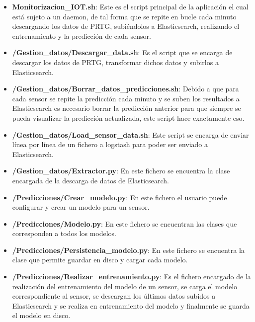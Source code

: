 \begin{itemize}
    \item \textbf{Monitorizacion\_IOT.sh}: Este es el script principal de la aplicación el cual está sujeto a un daemon, de tal forma que se repite en bucle cada minuto descargando los datos de PRTG, subiéndolos a Elasticsearch, realizando el entrenamiento y la predicción de cada sensor.
    
    \item \textbf{/Gestion\_datos/Descargar\_data.sh}: Es el script que se encarga de descargar los datos de PRTG, transformar dichos datos y subirlos a Elasticsearch.
    
    \item \textbf{/Gestion\_datos/Borrar\_datos\_predicciones.sh}: Debido a que para cada sensor se repite la predicción cada minuto y se suben los resultados a Elasticsearch es necesario borrar la predicción anterior para que siempre se pueda visualizar la predicción actualizada, este script hace exactamente eso.
    
    \item \textbf{/Gestion\_datos/Load\_sensor\_data.sh}: Este script se encarga de enviar línea por línea de un fichero a logstash para poder ser enviado a Elasticsearch.
    
    \item \textbf{/Gestion\_datos/Extractor.py}: En este fichero se encuentra la clase encargada de la descarga de datos de Elasticsearch.
    
    \item \textbf{/Predicciones/Crear\_modelo.py}: En este fichero el usuario puede configurar y crear un modelo para un sensor.
    
    \item \textbf{/Predicciones/Modelo.py}: En este fichero se encuentran las clases que corresponden a todos los modelos.
    
    \item \textbf{/Predicciones/Persistencia\_modelo.py}: En este fichero se encuentra la clase que permite guardar en disco y cargar cada modelo.
    
    \item \textbf{/Predicciones/Realizar\_entrenamiento.py}: Es el fichero encargado de la realización del entrenamiento del modelo de un sensor, se carga el modelo correspondiente al sensor, se descargan los últimos datos subidos a Elasticsearch y se realiza en entrenamiento del modelo y finalmente se guarda el modelo en disco.
    

\end{itemize}
